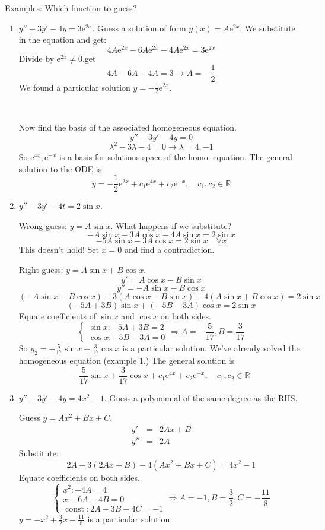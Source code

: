\documentclass{article}
\newcommand{\mathe}{\mathrm{e}}
\newcommand{\tmop}[1]{\ensuremath{\operatorname{#1}}}
\begin{document}
{\underline{Examples: Which function to guess?}}
\begin{enumerate}
  \item $y'' - 3 y' - 4 y = 3 \mathe^{2 x}$. Guess a solution of form $y (x) =
  A \mathe^{2 x}$. We substitute in the equation and get:
  \[ 4 A \mathe^{2 x} - 6 A \mathe^{2 x} - 4 A \mathe^{2 x} = 3 \mathe^{2 x}
  \]
  Divide by $\mathe^{2 x} \neq 0$.get
  \[ 4 A - 6 A - 4 A = 3 \rightarrow A = - \frac{1}{2} \]
  We found a particular solution $y = - \frac{1}{2} \mathe^{2 x}$.
  
  \
  
  Now find the basis of the associated
  homogeneous equation.
  \[ y'' - 3 y' - 4 y = 0 \]
  \[ \lambda^2 - 3 \lambda - 4 = 0 \rightarrow \lambda = 4, - 1 \]
  So $\mathe^{4 x}, \mathe^{- x}$ is a basis for solutions space of the homo.
  equation. The general solution to the ODE is
  \[ y = - \frac{1}{2} \mathe^{2 x} + c_1 \mathe^{4 x} + c_2 \mathe^{- x},
     \quad c_1, c_2 \in \mathbb{R} \]
  \item $y'' - 3 y' - 4 t = 2 \sin x$.
  
  Wrong guess: $y = A \sin x$. What happens if we substitute?
  \[ - A \sin x - 3 A \cos x - 4 A \sin x = 2 \sin x \]
  \[ - 5 A \sin x - 3 A \cos x = 2 \sin x \quad \forall x \]
  This doesn't hold! Set $x = 0$ and find a contradiction.
  
  Right guess: $y = A \sin x + B \cos x$.
  \[ y' = A \cos x - B \sin x \]
  \[ y'' = - A \sin x - B \cos x \]
  \[ (- A \sin x - B \cos x) - 3 (A \cos x - B \sin x) - 4 (A \sin x + B \cos
     x) = 2 \sin x \]
  \[ (- 5 A + 3 B) \sin x + (- 5 B - 3 A) \cos x = 2 \sin x \]
  Equate coefficients of $\sin x$ and $\cos x$ on both sides.
  \[ \left\{\begin{array}{l}
       \sin x : - 5 A + 3 B = 2\\
       \cos x : - 5 B - 3 A = 0
     \end{array}\right. \Rightarrow A = - \frac{5}{17}, B = \frac{3}{17} \]
  So $y_2 = - \frac{5}{17} \sin x + \frac{3}{17} \cos x$ is a particular
  solution. We've already solved the homogeneous equation (example 1.) The
  general solution is
  \[ - \frac{5}{17} \sin x + \frac{3}{17} \cos x + c_1 \mathe^{4 x} + c_2
     \mathe^{- x}, \quad c_1, c_2 \in \mathbb{R} \]
  \item $y'' - 3 y' - 4 y = 4 x^2 - 1$. Guess a polynomial of the same degree
  as the RHS.
  
  Guess $y = Ax^2 + Bx + C$.
  \begin{eqnarray*}
    y' & = & 2 Ax + B\\
    y'' & = & 2 A
  \end{eqnarray*}
  Substitute:
  \[ 2 A - 3 (2 Ax + B) - 4 (Ax^2 + Bx + C) = 4 x^2 - 1 \]
  Equate coefficients on both sides.
  \[ \left\{\begin{array}{l}
       x^2 : - 4 A = 4\\
       x : - 6 A - 4 B = 0\\
       \tmop{const} : 2 A - 3 B - 4 C = - 1
     \end{array}\right. \Rightarrow A = - 1, B = \frac{3}{2}, C = -
     \frac{11}{8} \]
  $y = - x^2 + \frac{3}{2} x - \frac{11}{8}$ is a particular solution.
  

\end{enumerate}
\end{document}
